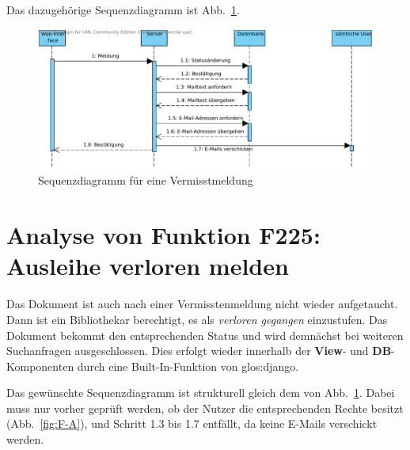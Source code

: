 Das dazugehörige Sequenzdiagramm ist Abb.\ \ref{fig:224}.
\begin{figure}[h]
\begin{center}
\includegraphics[width=0.8\linewidth]{bilder/Seq-Vermisst.pdf}
\caption{Sequenzdiagramm für eine Vermisstmeldung}
\label{fig:224}
\end{center}
\end{figure}

\section{Analyse von Funktion F225: Ausleihe verloren melden}
\label{f:225}
Das Dokument ist auch nach einer Vermisstenmeldung nicht wieder aufgetaucht. 
Dann ist ein Bibliothekar berechtigt, es als \emph{verloren gegangen} 
einzustufen. Das Dokument bekommt den entsprechenden Status und wird demnächst 
bei weiteren Suchanfragen ausgeschlossen. Dies erfolgt wieder innerhalb der 
\textbf{View}- und \textbf{DB}-Komponenten durch eine Built-In-Funktion von 
\gls{glos:django}.

Das gewünschte Sequenzdiagramm ist strukturell gleich dem von Abb.\ 
\ref{fig:224}. Dabei muss nur vorher geprüft werden, ob der Nutzer die 
entsprechenden Rechte besitzt (Abb.\ \ref{fig:F-A}), und Schritt 1.3 bis 1.7 
entfällt, da keine E-Mails verschickt werden.
